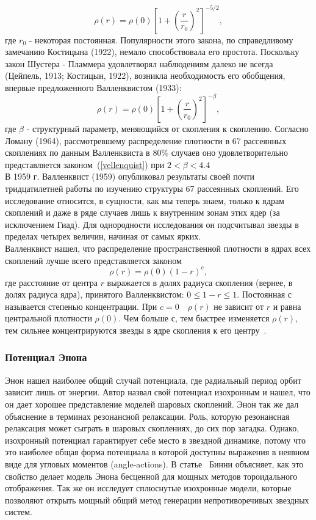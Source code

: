 $$
	\rho(r) = \rho(0)\left[1 + \left(\frac{r}{r_0} \right)^2 \right]^{-5/2},
$$
где $r_0$ - некоторая постоянная. Популярности этого закона, по справедливому замечанию Костицына (1922), немало способствовала его простота. Поскольку закон Шустера - Пламмера удовлетворял наблюдениям далеко не всегда (Цейпель, 1913; Костицын, 1922), возникла необходимость его обобщения, впервые предложенного Валленквистом (1933):\\

\begin{equation}\label{vellenquist}
	\rho(r) = \rho(0)\left[1 + \left(\frac{r}{r_0} \right)^2 \right]^{-\beta},
\end{equation}
где $\beta$ - структурный параметр, меняющийся от скопления к скоплению. Согласно Ломану (1964), рассмотревшему распределение плотности в 67 рассеянных скоплениях по данным Валленквиста в 80\% случаев оно удовлетворительно представляется законом~(\ref{vellenquist}) при $2 < \beta < 4.4$\\

В 1959 г. Валленквист (1959) опубликовал результаты своей почти тридцатилетней работы по изучению структуры 67 рассеянных скоплений. Его исследование относится, в сущности, как мы теперь знаем, только к ядрам скоплений и даже в ряде случаев лишь к внутренним зонам этих ядер (за исключением Гиад). Для однородности исследования он подсчитывал звезды в пределах четырех величин, начиная от самых ярких.\\

Валленквист нашел, что распределение пространственной плотности в ядрах всех скоплений лучше всего представляется законом
$$
	\rho(r) = \rho(0)(1 - r)^c,
$$
где расстояние от центра $r$ выражается в долях радиуса скопления (вернее, в долях радиуса ядра), принятого Валленквистом: $0 \leq 1 - r \leq 1$. Постоянная с называется степенью концентрации. При $c = 0\quad \rho(r)$ не зависит от $r$ и равна центральной плотности $\rho(0)$. Чем больше $с$, тем быстрее изменяется $\rho(r)$, тем сильнее концентрируются звезды в ядре скопления к его центру~\cite{SHUSTER_PLUMMER}.


\subsubsection{Потенциал Энона}
Энон нашел наиболее общий случай потенциала, где радиальный период орбит зависит лишь от энергии. Автор назвал свой потенциал изохронным и нашел, что он дает хорошее представление моделей шаровых скоплений. Энон так же дал объяснение в терминах резонансной релаксации. Роль, которую резонансная релаксация может сыграть в шаровых скоплениях, до сих пор загадка. Однако, изохронный потенциал гарантирует себе место в звездной динамике, потому что это наиболее общая форма потенциала в которой доступны выражения в неявном виде для угловых моментов (angle-actions). В статье~\cite{HENON}  Бинни объясняет, как это свойство делает модель Энона бесценной для мощных методов тороидального отображения. Так же он исследует сплюснутые изохронные модели, которые позволяют открыть мощный общий метод генерации непротиворечивых звездных систем.

